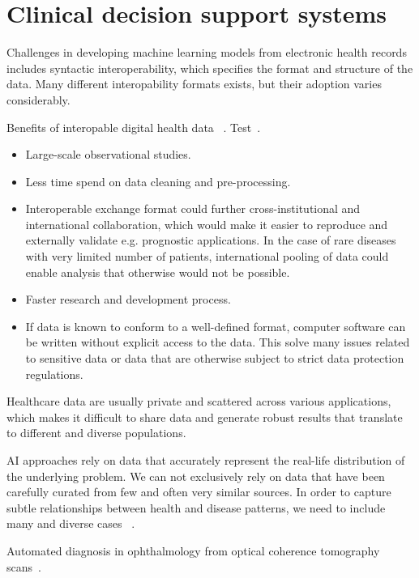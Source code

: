 \section{Clinical decision support systems}

Challenges in developing machine learning models from electronic health records
includes syntactic interoperability, 
which specifies the format and structure of the data.
Many different interopability formats exists, 
but their adoption varies considerably.

Benefits of interopable digital health data
~\autocite{lehneWhy2019}.
Test~\cite{lehneWhy2019}.

\begin{itemize}
    \item Large-scale observational studies.
    \item Less time spend on data cleaning and pre-processing.
    \item Interoperable exchange format could further cross-institutional
    and international collaboration, which would make it easier 
    to reproduce and externally validate e.g. prognostic applications.
    In the case of rare diseases with very limited number of patients, 
    international pooling of data could enable analysis
    that otherwise would not be possible.
    \item Faster research and development process.
    \item If data is known to conform to a well-defined format,
    computer software can be written without explicit access to the data.
    This solve many issues related to sensitive data or
    data that are otherwise subject to strict data protection regulations.
\end{itemize}


Healthcare data are usually private and scattered across various applications,
which makes it difficult to share data and generate robust results 
that translate to different and diverse populations.

AI approaches rely on data that accurately represent
the real-life distribution of the underlying problem.
We can not exclusively rely on data that have been carefully curated 
from few and often very similar sources. 
In order to capture subtle relationships 
between health and disease patterns,
we need to include many and diverse cases~%
\autocite{riekeFuture2020}.

Automated diagnosis in ophthalmology 
from optical coherence tomography scans~\autocite{defauwClinically2018}.

